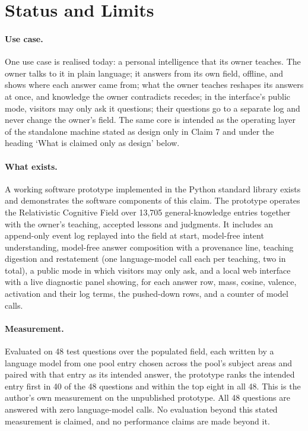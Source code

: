 \documentclass[11pt]{article}
\theoremstyle{remark}
\begin{document}
\section{Status and Limits}

\paragraph{Use case.} One use case is realised today: a personal intelligence that its owner teaches. The owner talks to it in plain language; it answers from its own field, offline, and shows where each answer came from; what the owner teaches reshapes its answers at once, and knowledge the owner contradicts recedes; in the interface's public mode, visitors may only ask it questions; their questions go to a separate log and never change the owner's field. The same core is intended as the operating layer of the standalone machine stated as design only in Claim 7 and under the heading `What is claimed only as design' below.


\paragraph{What exists.}
A working software prototype implemented in the Python standard library exists and demonstrates the software components of this claim. The prototype operates the Relativistic Cognitive Field over 13,705 general-knowledge entries together with the owner's teaching, accepted lessons and judgments. It includes an append-only event log replayed into the field at start, model-free intent understanding, model-free answer composition with a provenance line, teaching digestion and restatement (one language-model call each per teaching, two in total), a public mode in which visitors may only ask, and a local web interface with a live diagnostic panel showing, for each answer row, mass, cosine, valence, activation and their log terms, the pushed-down rows, and a counter of model calls.

\paragraph{Measurement.}
Evaluated on 48 test questions over the populated field, each written by a language model from one pool entry chosen across the pool's subject areas and paired with that entry as its intended answer, the prototype ranks the intended entry first in 40 of the 48 questions and within the top eight in all 48. This is the author's own measurement on the unpublished prototype. All 48 questions are answered with zero language-model calls. No evaluation beyond this stated measurement is claimed, and no performance claims are made beyond it.
\end{document}
